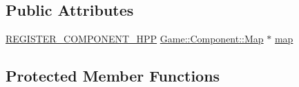 \subsection*{Public Attributes}
\begin{DoxyCompactItemize}
\item 
\mbox{\hyperlink{_core_8hpp_a895cfc16b36b6c309f80b98ded63df4f}{R\+E\+G\+I\+S\+T\+E\+R\+\_\+\+C\+O\+M\+P\+O\+N\+E\+N\+T\+\_\+\+H\+PP}} \mbox{\hyperlink{class_game_1_1_component_1_1_map}{Game\+::\+Component\+::\+Map}} $\ast$ \mbox{\hyperlink{class_game_1_1_component_1_1_i_a_a2ae49ef7e89503294de091af505fce74}{map}}
\end{DoxyCompactItemize}
\subsection*{Protected Member Functions}
